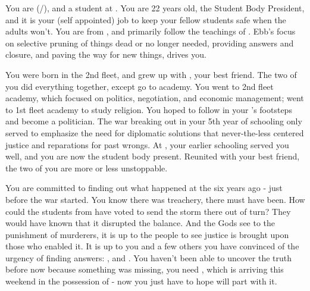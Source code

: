 \documentclass[char]{GL2020}
\begin{document}
\name{\cPresident{}}



You are \cPresident{} (\cPresident{\they}/\cPresident{\them}), and a student at \pSchool{}. You are 22 years old, the Student Body President, and it is your (self appointed) job to keep your fellow students safe when the adults won't. You are from \pShip{}, and primarily follow the teachings of \cEbb{\full}. Ebb's focus on selective pruning of things dead or no longer needed, providing answers and closure, and paving the way for new things, drives you.


You were born in the 2nd fleet, and grew up with \cInitiate{}, your best friend. The two of you did everything together, except go to academy. You went to 2nd fleet academy, which focused on politics, negotiation, and economic management; \cInitiate{\they} went to 1st fleet academy to study religion. You hoped to follow in your \cHeadDiplomat{\auncle}'s footsteps and become a politician. The war breaking out in your 5th year of schooling only served to emphasize the need for diplomatic solutions that never-the-less centered justice and reparations for past wrongs. At \pCollege{}, your earlier schooling served you well, and you are now the student body present. Reunited with your best friend, \cInitiate{} the two of you are more or less unstoppable.

You are committed to finding out what happened at the \pSc{} six years ago - just before the war started. You know there was treachery, there must have been. How could the students from \pShip{} have voted to send the storm there out of turn? They would have known that it disrupted the balance. And the Gods see to the punishment of murderers, it is up to the people to see justice is brought upon those who enabled it. It is up to you and a few others you have convinced of the urgency of finding answers: \cLibAssistant{}, and \cHeir{}. You haven't been able to uncover the truth before now because something was missing, you need \iMirror{}, which is arriving this weekend in the possession of \cDiplomat{} - now you just have to hope \cDiplomat{\they} will part with it.
\end{document}
